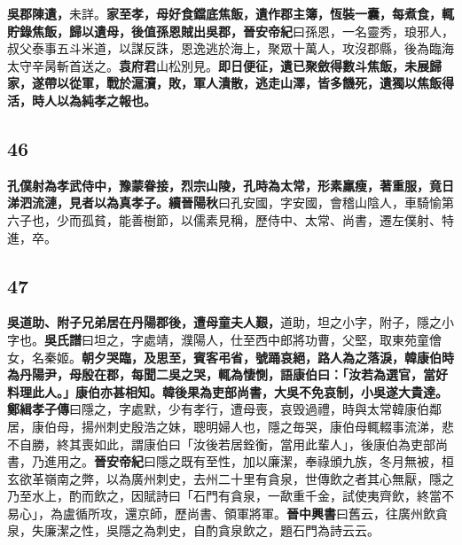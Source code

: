 \textbf{吳郡陳遺，}{\footnotesize 未詳。}\textbf{家至孝，母好食鐺底焦飯，遺作郡主簿，恆裝一囊，每煮食，輒貯錄焦飯，歸以遺母，後值孫恩賊出吳郡，}{\footnotesize \textbf{晉安帝紀}曰孫恩，一名靈秀，琅邪人，叔父泰事五斗米道，以謀反誅，恩逸逃於海上，聚眾十萬人，攻沒郡縣，後為臨海太守辛昺斬首送之。}\textbf{袁府君}{\footnotesize 山松別見。}\textbf{即日便征，遺已聚斂得數斗焦飯，未展歸家，遂帶以從軍，戰於滬瀆，敗，軍人潰散，逃走山澤，皆多饑死，遺獨以焦飯得活，時人以為純孝之報也。}

\subsection*{46}

\textbf{孔僕射為孝武侍中，豫蒙眷接，烈宗山陵，孔時為太常，形素羸瘦，著重服，竟日涕泗流漣，見者以為真孝子。}{\footnotesize \textbf{續晉陽秋}曰孔安國，字安國，會稽山陰人，車騎愉第六子也，少而孤貧，能善樹節，以儒素見稱，歷侍中、太常、尚書，遷左僕射、特進，卒。}

\subsection*{47}

\textbf{吳道助、附子兄弟居在丹陽郡後，遭母童夫人艱，}{\footnotesize 道助，坦之小字，附子，隱之小字也。\textbf{吳氏譜}曰坦之，字處靖，濮陽人，仕至西中郎將功曹，父堅，取東苑童儈女，名秦姬。}\textbf{朝夕哭臨，及思至，賓客弔省，號踊哀絕，路人為之落淚，韓康伯時為丹陽尹，母殷在郡，每聞二吳之哭，輒為悽惻，語康伯曰：「汝若為選官，當好料理此人。」康伯亦甚相知。韓後果為吏部尚書，大吳不免哀制，小吳遂大貴達。}{\footnotesize \textbf{鄭緝孝子傳}曰隱之，字處默，少有孝行，遭母喪，哀毁過禮，時與太常韓康伯鄰居，康伯母，揚州刺史殷浩之妹，聰明婦人也，隱之毎哭，康伯母輒輟事流涕，悲不自勝，終其喪如此，謂康伯曰「汝後若居銓衡，當用此輩人」，後康伯為吏部尚書，乃進用之。\textbf{晉安帝紀}曰隱之既有至性，加以廉潔，奉祿頒九族，冬月無被，桓玄欲革嶺南之弊，以為廣州刺史，去州二十里有貪泉，世傳飲之者其心無厭，隱之乃至水上，酌而飲之，因賦詩曰「石門有貪泉，一歃重千金，試使夷齊飲，終當不易心」，為盧循所攻，還京師，歷尚書、領軍將軍。\textbf{晉中興書}曰舊云，往廣州飲貪泉，失廉潔之性，吳隱之為刺史，自酌貪泉飲之，題石門為詩云云。}
